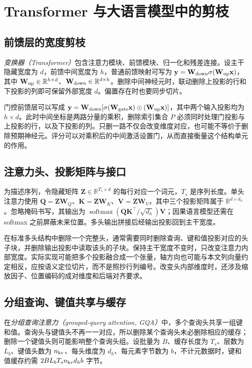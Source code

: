 \documentclass[UTF8,12pt,a4paper,fontset=fandol]{ctexart}
\begin{document}
\section{Transformer 与大语言模型中的剪枝}
\label{sec:prune-transformer}

\subsection{前馈层的宽度剪枝}
\emph{变换器（Transformer）}包含注意力模块、前馈模块、归一化和残差连接。设主干隐藏宽度为 $d$，前馈中间宽度为 $h$，普通前馈映射可写为 $\mathbf y=\mathbf W_{\rm down}\sigma(\mathbf W_{\rm up}\mathbf x)$，其中 $\mathbf W_{\rm up}\in\mathbb R^{h\times d}$、$\mathbf W_{\rm down}\in\mathbb R^{d\times h}$。删除中间神经元时，联动删除上投影的行和下投影的列即可保留外部宽度 $d$。偏置存在时也要同步切片。

门控前馈层可以写成 $\mathbf y=\mathbf W_{\rm down}[\sigma(\mathbf W_{\rm gate}\mathbf x)\odot(\mathbf W_{\rm up}\mathbf x)]$，其中两个输入投影均为 $h\times d$。此时中间坐标是两路分量的乘积，删除索引集合 $P$ 必须同时处理门投影与上投影的行，以及下投影的列。只删一路不仅会改变维度对应，也可能不等价于删除预期神经元。评分可以对乘积后的中间激活设置门，从而直接衡量这个结构单元的作用。

\subsection{注意力头、投影矩阵与接口}
为描述序列，令隐藏矩阵 $\mathbf Z\in\mathbb R^{T_s\times d}$ 的每行对应一个词元，$T_s$ 是序列长度。单头注意力使用 $\mathbf Q=\mathbf Z\mathbf W_Q$、$\mathbf K=\mathbf Z\mathbf W_K$、$\mathbf V=\mathbf Z\mathbf W_V$，其中三个投影矩阵属于 $\mathbb R^{d\times d_h}$。忽略掩码书写，其输出为 $\operatorname{softmax}(\mathbf Q\mathbf K^\top/\sqrt{d_h})\mathbf V$；因果语言模型还需在 softmax 之前屏蔽未来位置。多头输出拼接后经输出投影回到主干宽度。

在标准多头结构中删除一个完整头，通常需要同时删除查询、键和值投影对应的头子块，并删除输出投影中读取该头的子块。保持主干宽度不变时，只改变注意力内部宽度。实际实现可能把多个投影融合成一个张量，轴方向也可能与本文列向量约定相反，应按语义定位切片，而不是照抄行列编号。改变头内部维度时，还涉及缩放因子、位置编码的成对维度和后端对齐要求。

\subsection{分组查询、键值共享与缓存}
在\emph{分组查询注意力（grouped-query attention, GQA）}中，多个查询头共享一组键和值。查询头与键值头不再一一对应，所以删除某个查询头未必删除相应的缓存；删除一个键值头则可能影响整个查询头组。设批量为 $B$、缓存长度为 $T_s$、层数为 $L_b$、键值头数为 $n_{\rm kv}$、每头维度为 $d_h$、每元素字节数为 $b$，不计元数据时，键和值缓存约需 $2BL_bT_sn_{\rm kv}d_hb$ 字节。
\end{document}
